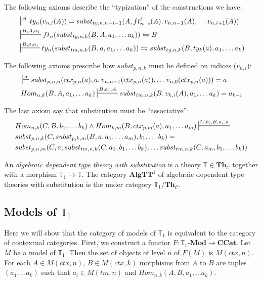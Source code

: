 \documentclass[reqno]{amsart}
\theoremstyle{definition}
\theoremstyle{remark}
\newcommand{\cat}[1]{\mathbf{#1}}
\newcommand{\ccat}{\cat{CCat}}
\newcommand{\algtt}{\cat{AlgTT}}
\newcommand{\Mod}[1]{#1\text{-}\cat{Mod}}
\newcommand{\Th}{\cat{Th}}
\newcommand{\ThC}{\Th_{\mathcal{C}}}
\numberwithin{figure}{section}
\begin{document}
The following axioms describe the ``typization'' of the constructions we have:
\begin{align}
\label{ax:type-var}
& \sststile{}{A}         ty_n(v_{n,i}(A)) = subst_{ty,n,n-i-1}(A, ft^i_{n-i}(A), v_{n,n-1}(A), \ldots v_{n,i+1}(A)) \\
\label{ax:type-subst-ty}
& \sststile{}{B, A, a_i} ft_n(subst_{ty,n,k}(B, A, a_1, \ldots a_k)) \leftrightharpoons B \\
\label{ax:type-subst-tm}
& \sststile{}{B, a, a_i} ty_n(subst_{tm,n,k}(B, a, a_1, \ldots a_k)) \leftrightharpoons subst_{ty,n,k}(B, ty_k(a), a_1, \ldots a_k)
\end{align}

The following axioms prescribe how $subst_{p,n,k}$ must be defined on indices ($v_{n,i}$):
\begin{align}
\label{ax:subst-var}
& \sststile{}{a}         subst_{p,n,n}(ctx_{p,n}(a), a, v_{n,n-1}(ctx_{p,n}(a)), \ldots v_{n,0}(ctx_{p,n}(a))) = a \\
\label{ax:var-subst}
& Hom_{n,k}(B, A, a_1, \ldots a_k) \sststile{}{B, a_i, A} subst_{tm,n,k}(B, v_{k,i}(A), a_1, \ldots a_k) = a_{k-i}
\end{align}

The last axiom say that substitution must be ``associative'':
\begin{align}
\label{ax:subst-subst}
& Hom_{n,k}(C, B, b_1, \ldots b_k) \land Hom_{k,m}(B, ctx_{p,m}(a), a_1, \ldots a_m) \sststile{}{C, b_i, B, a_i, a} \\ \notag
& subst_{p,n,k}(C, subst_{p,k,m}(B, a, a_1, \ldots a_m), b_1, \ldots b_k) = \\ \notag
& subst_{p,n,m}(C, a, subst_{tm,n,k}(C, a_1, b_1, \ldots b_k), \ldots subst_{tm,n,k}(C, a_m, b_1, \ldots b_k))
\end{align}

\begin{defn}
An \emph{algebraic dependent type theory with substitution} is a theory $\mathbb{T} \in \ThC$ together with a morphism $\mathbb{T}_1 \to \mathbb{T}$.
The category $\algtt^1$ of algebraic dependent type theories with substitution is the under category $\mathbb{T}_1/\ThC$.
\end{defn}

\subsection{Models of $\mathbb{T}_1$}

Here we will show that the category of models of $\mathbb{T}_1$ is equivalent to the category of contextual categories.
First, we construct a functor $F : \Mod{\mathbb{T}_1} \to \ccat$.
Let $M$ be a model of $\mathbb{T}_1$.
Then the set of objects of level $n$ of $F(M)$ is $M(ctx,n)$.
For each $A \in M(ctx,n)$, $B \in M(ctx,k)$ morphisms from $A$ to $B$ are tuples $(a_1, \ldots a_k)$ such that $a_i \in M(tm,n)$ and $Hom_{n,k}(A, B, a_1, \ldots a_k)$.
\end{document}
